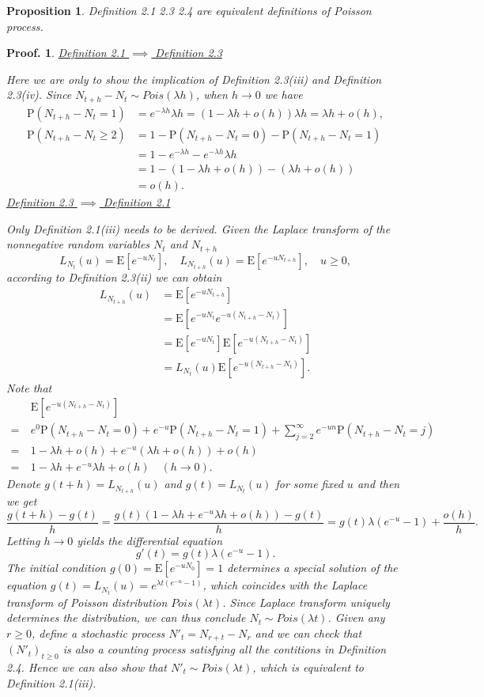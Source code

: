 \documentclass{article}
\newtheorem{proposition}{Proposition}[section]
\theoremstyle{nonumberplain}
\newtheorem{Proof}{Proof.}
\begin{document}
\begin{proposition}
	Definition 2.1 2.3 2.4 are equivalent definitions of Poisson process.
\end{proposition}
\begin{Proof}
	\underline{Definition 2.1 $\implies$ Definition 2.3} 
	
	Here we are only to show the implication of Definition 2.3(iii) and Definition 2.3(iv). Since $N_{t+h}-N_t\sim Pois(\lambda h)$, when $h\to0$ we have 
	\begin{align*}
		\mathrm{P}(N_{t+h}-N_t=1)&=e^{-\lambda h}\lambda h=(1-\lambda h+o(h))\lambda h=\lambda h+o(h),\\
		\mathrm{P}(N_{t+h}-N_t\ge2)&=1-\mathrm{P}(N_{t+h}-N_t=0)-\mathrm{P}(N_{t+h}-N_t=1)\\
		&=1-e^{-\lambda h}-e^{-\lambda h}\lambda h\\
		&=1-(1-\lambda h+o(h))-(\lambda h+o(h))\\
		&=o(h).
	\end{align*}
	\underline{Definition 2.3 $\implies$ Definition 2.1} 
	
	Only Definition 2.1(iii) needs to be derived. Given the Laplace transform of the nonnegative random variables $N_t$ and $N_{t+h}$
	\[
	L_{N_t}(u)=\mathrm{E}[e^{-uN_t}],\quad
	L_{N_{t+h}}(u)=\mathrm{E}[e^{-uN_{t+h}}],\quad u\ge0,
	\]
	according to Definition 2.3(ii) we can obtain
	\begin{align*}
	L_{N_{t+h}}(u)&=\mathrm{E}[e^{-uN_{t+h}}]\\
	&=\mathrm{E}[e^{-uN_{t}}e^{-u(N_{t+h}-N_t)}]\\
	&=\mathrm{E}[e^{-uN_{t}}]\mathrm{E}[e^{-u(N_{t+h}-N_t)}]\\
	&=L_{N_t}(u)\mathrm{E}[e^{-u(N_{t+h}-N_t)}].
	\end{align*}
	Note that 
	\begin{align*}
	&\mathrm{E}[e^{-u(N_{t+h}-N_t)}]\\
	=\ &e^{0}\mathrm{P}(N_{t+h}-N_t=0)+e^{-u}\mathrm{P}(N_{t+h}-N_t=1)+\sum_{j=2}^{\infty}e^{-un}\mathrm{P}(N_{t+h}-N_t=j)\\
	=\ &1-\lambda h+o(h)+e^{-u}(\lambda h+o(h))+o(h)\\
	=\ &1-\lambda h+e^{-u}\lambda h+o(h)\quad(h\to 0).
	\end{align*}
	Denote $g(t+h)=L_{N_{t+h}}(u)$ and $g(t)=L_{N_{t}}(u)$ for some fixed $u$ and then we get 
	\[
	\frac{g(t+h)-g(t)}{h}=\frac{g(t)(1-\lambda h+e^{-u}\lambda h+o(h))-g(t)}{h}=g(t)\lambda (e^{-u}-1)+\frac{o(h)}{h}.
	\]
	Letting $h\to 0$ yields the differential equation
	\[
	g'(t)=g(t)\lambda (e^{-u}-1).
	\]
	The initial condition $g(0)=\mathrm{E}[e^{-uN_{0}}]=1$ determines a special solution of the equation $g(t)=L_{N_{t}}(u)=e^{\lambda t (e^{-u}-1)}$, which coincides with the Laplace transform of Poisson distribution $Pois(\lambda t)$. Since Laplace transform uniquely determines the distribution, we can thus conclude $N_{t}\sim Pois(\lambda t)$. Given any $r\ge 0$, define a stochastic process $N'_t=N_{r+t}-N_r$ and we can check that $(N'_t)_{t\ge 0}$ is also a counting process satisfying all the contitions in Definition 2.4. Hence we can also show that $N'_{t}\sim Pois(\lambda t)$, which is equivalent to Definition 2.1(iii).
	

\end{Proof}
\end{document}
